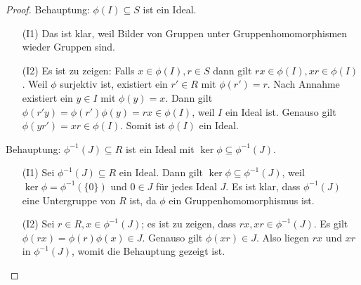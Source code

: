 \documentclass[12pt,a4paper]{scrartcl}
\begin{document}
\begin{proof}
	Behauptung: $\phi(I)\subseteq S$ ist ein Ideal.
	\begin{itemize}
		\item[(I1)] Das ist klar, weil Bilder von Gruppen unter Gruppenhomomorphismen wieder Gruppen sind.
		\item[(I2)] Es ist zu zeigen: Falls $x\in \phi(I) , r\in S$ dann gilt $ rx\in \phi(I), xr\in \phi(I)$. Weil $\phi$ surjektiv ist, existiert ein $r'\in R$ mit $\phi(r') = r$. Nach Annahme existiert ein $y \in I$ mit $\phi(y) = x$. Dann gilt $\phi(r'y) = \phi (r')\phi(y)  = rx\in \phi(I)$, weil  $I$ ein Ideal ist. Genauso gilt $\phi(yr') = xr\in\phi(I)$. Somit ist $\phi(I)$ ein Ideal.
	\end{itemize}
	Behauptung: $\phi^{-1}(J)\subseteq R$ ist ein Ideal mit $\ker\phi \subseteq \phi^{-1}(J)$.
	\begin{itemize}
		\item[(I1)]	Sei $\phi^{-1}(J)\subseteq R$ ein Ideal. Dann gilt $\ker\phi\subseteq \phi^{-1}(J)$, weil $\ker\phi = \phi^{-1}(\{0\})$ und $0\in J$ für jedes Ideal $J$. Es ist klar, dass $\phi^{-1}(J)$ eine Untergruppe von $R$ ist, da $\phi$ ein Gruppenhomomorphismus ist. 
		\item[(I2)] Sei $r\in R, x\in\phi^{-1}(J)$; es ist zu zeigen, dass $rx, xr\in\phi^{-1}(J)$. Es gilt $\phi(rx) = \phi(r)\phi(x)\in J$. Genauso gilt $\phi(xr)\in J$. Also liegen $rx$ und $xr$ in $\phi^{-1}(J)$, womit die Behauptung gezeigt ist.
	\end{itemize}


\end{proof}
\end{document}
